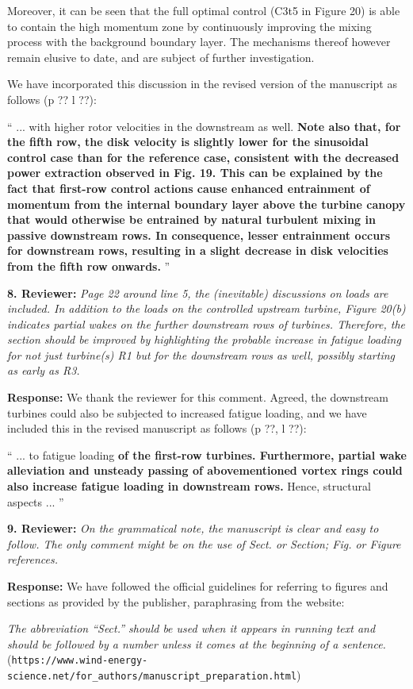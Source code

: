 \documentclass[]{article}
\begin{document}
Moreover, it can be seen that the full optimal control (C3t5 in Figure 20) is able to contain the high momentum zone by continuously improving the mixing process with the background boundary layer. The mechanisms thereof however remain elusive to date, and are subject of further investigation. 

We have incorporated this discussion in the revised version of the manuscript as follows (p ?? l ??): 

``
... with higher rotor velocities in the downstream as well.  \textbf{Note also that, for the fifth row, the disk velocity is slightly lower for the sinusoidal control case than for the reference case, consistent with the decreased power extraction observed in Fig. 19. This can be explained by the fact that first-row control actions cause enhanced entrainment of momentum from the internal boundary layer above the turbine canopy that would otherwise be entrained by natural turbulent mixing in passive downstream rows. In consequence, lesser entrainment occurs for downstream rows, resulting in a slight decrease in disk velocities from the fifth row onwards.}
''

\dotfill

\textbf{8. Reviewer: } \textit{Page 22 around line 5, the (inevitable) discussions on loads are included. In addition
	to the loads on the controlled upstream turbine, Figure 20(b) indicates partial wakes
	on the further downstream rows of turbines. Therefore, the section should be improved
	by highlighting the probable increase in fatigue loading for not just turbine(s) R1 but for
	the downstream rows as well, possibly starting as early as R3.}

\textbf{Response: } We thank the reviewer for this comment. Agreed, the downstream turbines could also be subjected to increased fatigue loading, and we have included this in the revised manuscript as follows (p ??, l ??):

``
... to fatigue loading \textbf{of the first-row turbines. Furthermore, partial wake alleviation and unsteady passing of abovementioned vortex rings could also increase fatigue loading in downstream rows.} Hence, structural aspects ...
''

\dotfill

\textbf{9. Reviewer: } \textit{On the grammatical note, the manuscript is clear and easy to follow. The only comment
	might be on the use of Sect. or Section; Fig. or Figure references.}

\textbf{Response: } We have followed the official guidelines for referring to figures and sections as provided by the publisher, paraphrasing from the website:\

\emph{The abbreviation ``Sect.'' should be used when it appears in running text and should be followed by a number unless it comes at the beginning of a sentence.}\\({\small \verb|https://www.wind-energy-science.net/for_authors/manuscript_preparation.html|})
\end{document}
